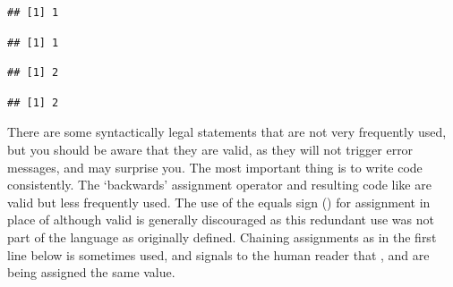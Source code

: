 \documentclass[krantz2]{krantz}\usepackage{knitr}%
\begin{document}
\begin{knitrout}\footnotesize
{}\color{fgcolor}\begin{kframe}
\begin{alltt}
\end{alltt}
\begin{verbatim}
## [1] 1
\end{verbatim}
\begin{alltt}
\end{alltt}
\begin{verbatim}
## [1] 1
\end{verbatim}
\begin{alltt}
 \hlopt{+}
\end{alltt}
\begin{verbatim}
## [1] 2
\end{verbatim}
\begin{alltt}
 \hlopt{+}\hlstd{)}
\end{alltt}
\begin{verbatim}
## [1] 2
\end{verbatim}
\end{kframe}
\end{knitrout}
\begin{playground}
There are some syntactically legal statements that are not very frequently used, but you should be aware that they are valid, as they will not trigger error messages, and may surprise you. The most important thing is to write code consistently. The `backwards' assignment operator \Roperator{->} and resulting code like  are valid but less frequently used. The use of the equals sign (\Roperator{=}) for assignment in place of \Roperator{<-} although valid is generally discouraged as this redundant use was not part of the \Rlang language as originally defined. Chaining assignments as in the first line below is sometimes used, and signals to the human reader that ,  and  are being assigned the same value.

\begin{knitrout}\footnotesize
{}\color{fgcolor}\begin{kframe}
\begin{alltt}
 \hlkwb{<-}  \hlkwb{<-}  \hlkwb{<-} 
 \hlkwb{->} 
 \hlkwb{=} 
\end{alltt}
\end{kframe}
\end{knitrout}

\end{playground}
\end{document}
